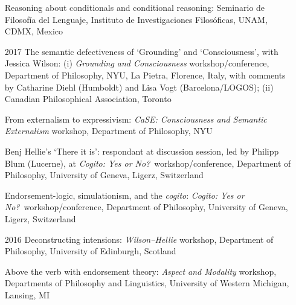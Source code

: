 \documentclass[12pt]{article}
\begin{document}
\begin{itemize}
	Reasoning about conditionals and conditional reasoning: Seminario de Filosof\'ia del Lenguaje, Instituto de Investigaciones Filos\'oficas, UNAM, CDMX, Mexico
	
	
	\item[2017] The semantic defectiveness of `Grounding' and `Consciousness', with Jessica Wilson: (i) \emph{Grounding and Consciousness} workshop/conference, Department of Philosophy, NYU, La Pietra, Florence, Italy, with comments by Catharine Diehl (Humboldt) and Lisa Vogt (Barcelona/LOGOS); (ii) Canadian Philosophical Association, Toronto

	From externalism to expressivism: \emph{CaSE: Consciousness and Semantic Externalism} workshop, Department of Philosophy, NYU

	Benj Hellie's `There it is': respondant at discussion session, led by Philipp Blum (Lucerne), at \emph{Cogito: Yes or No?}\ workshop/conference, Department of Philosophy, University of Geneva, Ligerz, Switzerland

	Endorsement-logic, simulationism, and the \emph{cogito}: \emph{Cogito: Yes or No?}\ workshop/conference, Department of Philosophy, University of Geneva, Ligerz, Switzerland
	
	\item[2016] Deconstructing intensions: \emph{Wilson--Hellie} workshop, Department of Philosophy, University of Edinburgh, Scotland

	Above the verb with endorsement theory: \emph{Aspect and Modality} workshop, Departments of Philosophy and Linguistics, University of Western Michigan, Lansing, MI
	
	
	
	
	
	

\end{itemize}
\end{document}
